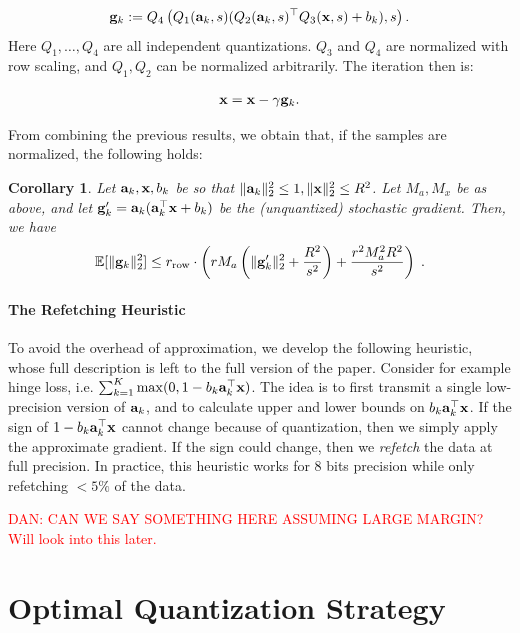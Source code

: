 \documentclass{article}
\def\a{{\bf a}}
\def\g{{\bf g}}
\def\x{{\bf x}}
\def\E{\mathbb{E}}
\def\rrow{r_\mathrm{row}}
\newtheorem{corollary}{Corollary}
\begin{document}
\begin{eqnarray}
	\g_k := Q_4 \left( Q_1(\a_k, s ) ( Q_2(\a_k, s)^\top Q_3(\x, s) + b_k) , s \right).
\end{eqnarray}
\noindent Here $Q_1, \ldots, Q_4$ are all independent quantizations.  $Q_3$ and  $Q_4$ are normalized with row scaling, and $Q_1, Q_2$ can be normalized arbitrarily.
The iteration then is: 

\begin{eqnarray}
	\x = \x - \gamma \g_k.
\end{eqnarray}

\noindent From combining the previous results, we obtain that, if the samples are normalized, the following holds:

\begin{corollary}
    \label{cor:full-quantization}
    Let $\a_k, \x, b_k$ be so that $\| \a_k \|_2^2 \leq 1, \| \x \|_2^2 \leq R^2$.
    Let $M_a, M_x$ be as above, and let $\g'_k = \a_k (\a_k^\top \x + b_k)$ be the (unquantized) stochastic gradient.
    Then, we have
    \[
    \E [\| \g_k \|_2^2] \leq \rrow \cdot \left( r M_a \left( \| \g'_k \|_2^2 + \frac{R^2}{s^2} \right)  + \frac{r^2 M_a^2 R^2}{s^2} \right) \; .
    \]
\end{corollary}






\paragraph*{The Refetching Heuristic}
To avoid the overhead of approximation, we develop the following heuristic, whose full description is left to the full version of the paper. 
Consider for example hinge loss, i.e.  $\sum_{k=1}^K \max(0, 1 - b_k \a_k^\top \x)$. 
The idea is to 
first transmit a single low-precision version of $\a_k$, and to  
calculate upper and lower bounds on $b_k \a_k^\top \x$.
If the sign of $1-b_k \a_k^\top \x$ cannot change because of quantization, then we simply apply the approximate gradient. 
If the sign could change, then we {\em refetch} the data at full precision.
In practice, this heuristic works for 
8 bits precision while only refetching $<5\%$
of the data.

\textcolor{red}{DAN: CAN WE SAY SOMETHING HERE ASSUMING LARGE MARGIN?}
\textcolor{red}{Will look into this later.}

\section{Optimal Quantization Strategy}
\end{document}
